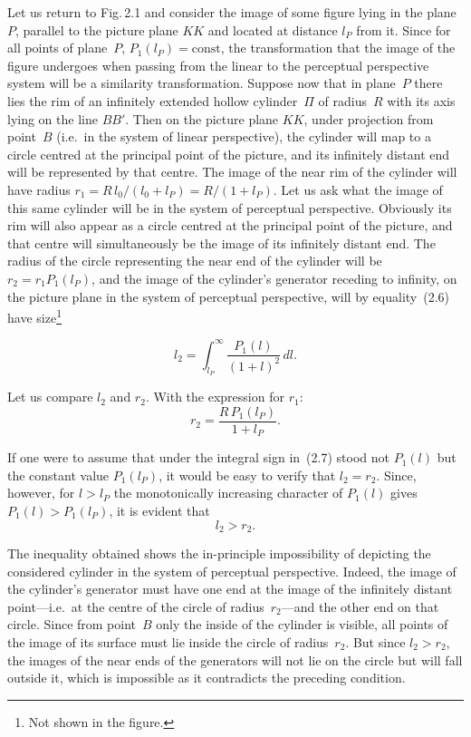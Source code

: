Let us return to Fig.\,2.1 and consider the image of some figure lying in the plane~$P$,
parallel to the picture plane $KK$ and located at distance $l_P$ from it.  Since for all
points of plane~$P$, $P_1(l_P) = \mathrm{const}$, the transformation that the image of the
figure undergoes when passing from the linear to the perceptual perspective system will be
a similarity transformation.  Suppose now that in plane~$P$ there lies the rim of an
infinitely extended hollow cylinder~$\Pi$ of radius~$R$ with its axis lying on the line $BB'$.
Then on the picture plane $KK$, under projection from point~$B$ (i.e.\ in the system of
linear perspective), the cylinder will map to a circle centred at the principal point of the
picture, and its infinitely distant end will be represented by that centre.  The image of the
near rim of the cylinder will have radius $r_1 = R\,l_0/(l_0 + l_P) = R/(1+l_P)$.  Let us
ask what the image of this same cylinder will be in the system of perceptual perspective.
Obviously its rim will also appear as a circle centred at the principal point of the picture,
and that centre will simultaneously be the image of its infinitely distant end.  The radius of
the circle representing the near end of the cylinder will be $r_2 = r_1 P_1(l_P)$, and the
image of the cylinder's generator receding to infinity, on the picture plane in the system of
perceptual perspective, will by equality~(2.6) have size\footnote{Not shown in the figure.}

\begin{equation}
  l_2 = \int_{l_P}^{\infty} \frac{P_1(l)}{(1+l)^2}\,dl.
  \tag{2.7}
\end{equation}

Let us compare $l_2$ and $r_2$.  With the expression for $r_1$:
\begin{equation}
  r_2 = \frac{R\,P_1(l_P)}{1+l_P}.
  \tag{2.8}
\end{equation}

If one were to assume that under the integral sign in~(2.7) stood not $P_1(l)$ but the
constant value $P_1(l_P)$, it would be easy to verify that $l_2 = r_2$.  Since, however, for
$l > l_P$ the monotonically increasing character of $P_1(l)$ gives $P_1(l) > P_1(l_P)$, it
is evident that
\begin{equation}
  l_2 > r_2.
  \tag{2.9}
\end{equation}

The inequality obtained shows the in-principle impossibility of depicting the considered
cylinder in the system of perceptual perspective.  Indeed, the image of the cylinder's
generator must have one end at the image of the infinitely distant point---i.e.\ at the centre
of the circle of radius~$r_2$---and the other end on that circle.  Since from point~$B$ only
the inside of the cylinder is visible, all points of the image of its surface must lie inside the
circle of radius~$r_2$.  But since $l_2 > r_2$, the images of the near ends of the generators
will not lie on the circle but will fall outside it, which is impossible as it contradicts the
preceding condition.

